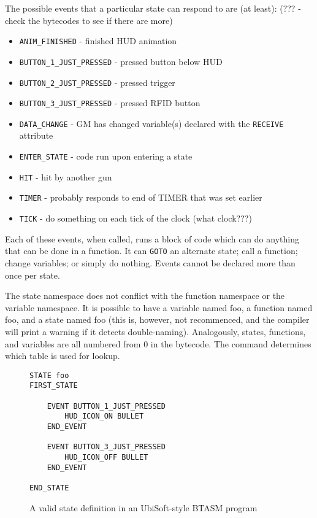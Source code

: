 \documentclass[12pt,a4paper]{scrbook}
\begin{document}
The possible events that a particular state can respond to are (at least): (??? - check the 
bytecodes to see if there are more)
\begin{itemize}
\item \texttt{ANIM\_FINISHED} - finished HUD animation
\item \texttt{BUTTON\_1\_JUST\_PRESSED} - pressed button below HUD
\item \texttt{BUTTON\_2\_JUST\_PRESSED} - pressed trigger
\item \texttt{BUTTON\_3\_JUST\_PRESSED} - pressed RFID button
\item \texttt{DATA\_CHANGE} - GM has changed variable(s) declared with the \texttt{RECEIVE} attribute
\item \texttt{ENTER\_STATE} - code run upon entering a state
\item \texttt{HIT} - hit by another gun
\item \texttt{TIMER} - probably responds to end of TIMER that was set earlier
\item \texttt{TICK} - do something on each tick of the clock (what clock???)
\end{itemize}

Each of these events, when called, runs a block of code which can do anything that can be done
in a function.  It can \texttt{GOTO} an alternate state; call a function; change variables; or
simply do nothing.  Events cannot be declared more than once per state.

The state namespace does not conflict with the function namespace or the variable namespace.  It is
possible to have a variable named foo, a function named foo, and a state named foo (this is, however,
not recommenced, and the compiler will print a warning if it detects double-naming).  Analogously,
states, functions, and variables are all numbered from 0 in the bytecode.  The command determines
which table is used for lookup.


\begin{figure}[h]
\begin{lstlisting}
STATE foo
FIRST_STATE

	EVENT BUTTON_1_JUST_PRESSED
		HUD_ICON_ON BULLET
	END_EVENT

	EVENT BUTTON_3_JUST_PRESSED
		HUD_ICON_OFF BULLET
	END_EVENT

END_STATE
\end{lstlisting}
\caption{A valid state definition in an UbiSoft-style BTASM program} 
\end{figure}
\end{document}
